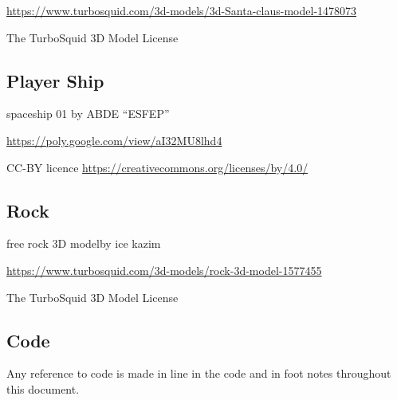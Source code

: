 \documentclass[11pt]{report}
\begin{document}
\url{https://www.turbosquid.com/3d-models/3d-Santa-claus-model-1478073}

The TurboSquid 3D Model License

\subsection*{Player Ship}
spaceship 01 by ABDE “ESFEP”

\url{https://poly.google.com/view/aI32MU8lhd4}

CC-BY licence
\url{https://creativecommons.org/licenses/by/4.0/}

\subsection*{Rock}
free rock 3D modelby ice kazim

\url{https://www.turbosquid.com/3d-models/rock-3d-model-1577455}

The TurboSquid 3D Model License

\subsection*{Code}
Any reference to code is made in line in the code and in foot notes throughout this document.
\end{document}
